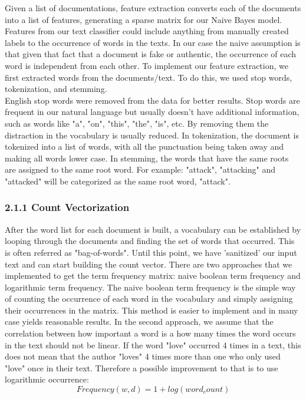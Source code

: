 \documentclass{neu_handout}
\begin{document}
Given a list of documentations, feature extraction converts each of the documents into a list of features, generating a sparse matrix for our Naive Bayes model. Features from our text classifier could include anything from manually created labels to the occurrence of words in the texts. In our case the naive assumption is that given that fact that a document is fake or authentic, the occurrence of each word is independent from each other. To implement our feature extraction, we first extracted words from the documents/text. To do this, we used stop words, tokenization, and stemming.\\

English stop words were removed from the data for better results. Stop words are frequent in our natural language but usually doesn't have additional information, such as words like "a", "on", "this", "the", "is", etc. By removing them the distraction in the vocabulary is usually reduced. In tokenization, the document is tokenized into a list of words, with all the punctuation being taken away and making all words lower case. In stemming, the words that have the same roots are assigned to the same root word. For example: "attack", "attacking" and "attacked" will be categorized as the same root word, "attack".

\subsubsection*{2.1.1 Count Vectorization}

After the word list for each document is built, a vocabulary can be established by looping through the documents and finding the set of words that occurred. This is often referred as "bag-of-words". Until this point, we have 'sanitized' our input text and can start building the count vector. There are two approaches that we implemented to get the term frequency matrix: naive boolean term frequency and logarithmic term frequency. The naive boolean term frequency is the simple way of counting the occurrence of each word in the vocabulary and simply assigning their occurrences in the matrix. This method is easier to implement and in many case yields reasonable results. In the second approach, we assume that the correlation between how important a word is a how many times the word occurs in the text should not be linear. If the word "love" occurred 4 times in a text, this does not mean that the author "loves" 4 times more than one who only used "love" once in their text. Therefore a possible improvement to that is to use logarithmic occurrence:
$$Frequency(w,d) = 1 + log(word_count)$$
 
\end{document}
